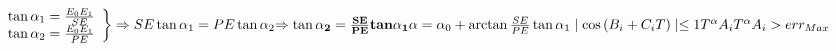 \documentclass{article}
\begin{document}
\begin{math}
$$
\left.
\begin{array}{l}
\tan{\alpha_{1}}=\frac{E_{0}E_{1}}{SE}\\
\tan{\alpha_{2}}=\frac{E_{0}E_{1}}{PE}
\end{array}
\right\rbrace
\Rightarrow SE\tan{\alpha_{1}}=PE\tan{\alpha_{2}}
\bf{\Rightarrow \tan{\alpha_{2}}=\frac{SE}{PE}tan{\alpha_{1}}}
$$
\\
\\
\\
\\
\alpha=\alpha_{0}+\arctan{\frac{SE}{PE}\tan{\alpha_{1}}}
\\
\\
\mid\cos{(B_{i}+C_{i}T)}\mid \leq 1
\\
\\
T^{\alpha}A_{i}
\\
\\
T^{\alpha}A_{i}>err_{Max}
\end{math}
\end{document}
